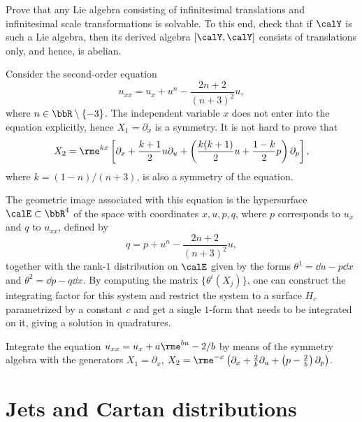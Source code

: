 \begin{xca}
    Prove that any Lie algebra consisting of infinitesimal translations and infinitesimal scale transformations is solvable. To this end, check that if $\calY$ is such a Lie algebra, then its derived algebra $[\calY,\calY]$ consists of translations only, and hence, is abelian.
\end{xca}


\begin{example}
    Consider the second-order equation 
    \[u_{xx}=u_x+u^n-\frac{2n+2}{(n+3)^2}u,\]
    where $n\in\bbR\setminus\{-3\}$. The independent variable $x$ does not enter into the equation explicitly, hence $X_1=\partial_x$  is a symmetry. It is not hard to prove that 
    \[X_2=\rme^{kx}\left[\partial_x+\frac{k+1}{2}u\partial_u+\left(\frac{k(k+1)}{2}u+\frac{1-k}{2}p\right)\partial_p\right],\]
    where $k=(1-n)/(n+3)$, is also a symmetry of the equation.

    The geometric image associated with this equation is the hypersurface $\calE\subset\bbR^4$ of the space with coordinates $x,u,p,q$, where $p$ corresponds to $u_x$ and $q$ to $u_{xx}$, defined by 
    \[q=p+u^n-\frac{2n+2}{(n+3)^2}u,\]
    together with the rank-$1$ distribution on $\calE$ given by the forms $\theta^1=\dd u-p\dd x$ and $\theta^2=\dd p-q\dd x$. By computing the matrix $\{\theta^i(X_j)\}$, one can construct the integrating factor for this system and restrict the system to a surface $H_c$ parametrized by a constant $c$ and get a single $1$-form that needs to be integrated on it, giving a solution in quadratures.
\end{example}


\begin{xca}
    Integrate the equation $u_{xx}=u_x+a\rme^{bu}-2/b$ by means of the symmetry algebra with the generators $X_1=\partial_x$, $X_2=\rme^{-x}\left(\partial_x+\frac{2}{b}\partial_u+\left(p-\frac{2}{b}\right)\partial_p\right)$.
\end{xca}







\section{Jets and Cartan distributions}\label{sec: jets and cartan distr}


